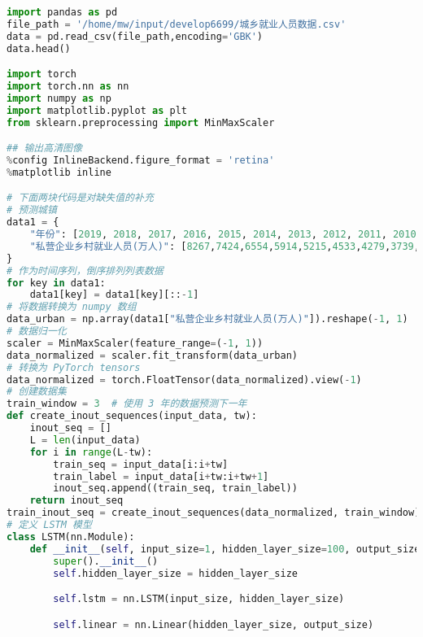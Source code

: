 \begin{lstlisting}[language=python,caption={城乡互联网}]
\end{lstlisting}

\begin{lstlisting}[language=python,caption={就业前景}]
import pandas as pd
file_path = '/home/mw/input/develop6699/城乡就业人员数据.csv'
data = pd.read_csv(file_path,encoding='GBK')
data.head()

import torch
import torch.nn as nn
import numpy as np
import matplotlib.pyplot as plt
from sklearn.preprocessing import MinMaxScaler

## 输出高清图像
%config InlineBackend.figure_format = 'retina'
%matplotlib inline

# 下面两块代码是对缺失值的补充
# 预测城镇
data1 = {
    "年份": [2019, 2018, 2017, 2016, 2015, 2014, 2013, 2012, 2011, 2010, 2009, 2008, 2007, 2006, 2005, 2004, 2003, 2002, 2001, 2000, 1999, 1998, 1997, 1996, 1995, 1994, 1993, 1992, 1991, 1990],
    "私营企业乡村就业人员(万人)": [8267,7424,6554,5914,5215,4533,4279,3739,3442,3347,3063,2780,2672,2632,2366,2024,1754,1411,1187,1139,969,737,600,551,471,316,187,134,116,113],
}
# 作为时间序列，倒序排列列表数据
for key in data1:
    data1[key] = data1[key][::-1]
# 将数据转换为 numpy 数组
data_urban = np.array(data1["私营企业乡村就业人员(万人)"]).reshape(-1, 1)
# 数据归一化
scaler = MinMaxScaler(feature_range=(-1, 1))
data_normalized = scaler.fit_transform(data_urban)
# 转换为 PyTorch tensors
data_normalized = torch.FloatTensor(data_normalized).view(-1)
# 创建数据集
train_window = 3  # 使用 3 年的数据预测下一年
def create_inout_sequences(input_data, tw):
    inout_seq = []
    L = len(input_data)
    for i in range(L-tw):
        train_seq = input_data[i:i+tw]
        train_label = input_data[i+tw:i+tw+1]
        inout_seq.append((train_seq, train_label))
    return inout_seq
train_inout_seq = create_inout_sequences(data_normalized, train_window)
# 定义 LSTM 模型
class LSTM(nn.Module):
    def __init__(self, input_size=1, hidden_layer_size=100, output_size=1):
        super().__init__()
        self.hidden_layer_size = hidden_layer_size

        self.lstm = nn.LSTM(input_size, hidden_layer_size)

        self.linear = nn.Linear(hidden_layer_size, output_size)


\end{lstlisting}
